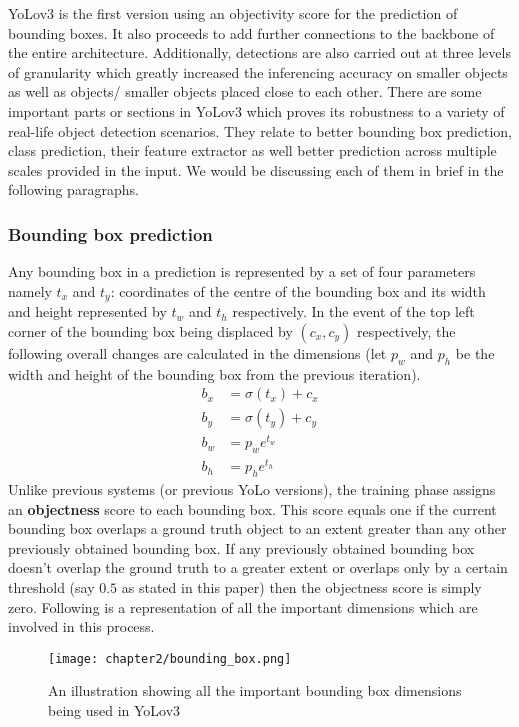 YoLov3 is the first version using an objectivity score for the prediction of bounding boxes. It also proceeds to add further connections to the backbone of the entire architecture. Additionally, detections are also carried out at three levels of granularity which greatly increased the inferencing accuracy on smaller objects as well as objects/ smaller objects placed close to each other. There are some important parts or sections in YoLov3 which proves its robustness to a variety of real-life object detection scenarios. They relate to better bounding box prediction, class prediction, their feature extractor as well better prediction across multiple scales provided in the input. We would be discussing each of them in brief in the following paragraphs. \par

\subsubsection{Bounding box prediction}
Any bounding box in a prediction is represented by a set of four parameters namely $t_x$ and $t_y$: coordinates of the centre of the bounding box and its width and height represented by $t_w$ and $t_h$ respectively. In the event of the top left corner of the bounding box being displaced by $(c_x,c_y)$ respectively, the following overall changes are calculated in the dimensions (let $p_w$ and $p_h$ be the width and height of the bounding box from the previous iteration).
\begin{align*}
b_x &=  \sigma(t_x) + c_x \\
b_y &=  \sigma(t_y) + c_y \\
b_w &=  {p_w}e^{t_w} \\
b_h &=  {p_h}e^{t_h}
\end{align*}
Unlike previous systems (or previous YoLo versions), the training phase assigns an \textbf{objectness} score to each bounding box. This score equals one if the current bounding box overlaps a ground truth object to an extent greater than any other previously obtained bounding box. If any previously obtained bounding box doesn’t overlap the ground truth to a greater extent or overlaps only by a certain threshold (say $0.5$ as stated in this paper) then the objectness score is simply zero. Following is a representation of all the important dimensions which are involved in this process.

\begin{figure}
  \centering
  \texttt{[image: chapter2/bounding\_box.png]}
  \caption{An illustration showing all the important bounding box dimensions being used in YoLov3}
  \label{fig:bbox}
\end{figure}

